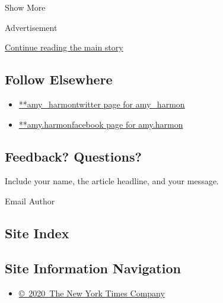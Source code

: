 Show More

Advertisement

\protect\hyperlink{after-mid2}{Continue reading the main story}

\hypertarget{follow-elsewhere}{%
\subsection{Follow Elsewhere}\label{follow-elsewhere}}

\begin{itemize}
\tightlist
\item
  \href{https://twitter.com/amy_harmon}{**amy\_harmontwitter page for
  amy\_harmon}
\item
  \href{https://www.facebook.com/amy.harmon}{**amy.harmonfacebook page
  for amy.harmon}
\end{itemize}

\hypertarget{feedback-questions}{%
\subsection{Feedback? Questions?}\label{feedback-questions}}

Include your name, the article headline, and your message.

Email Author

\hypertarget{site-index}{%
\subsection{Site Index}\label{site-index}}

\hypertarget{site-information-navigation}{%
\subsection{Site Information
Navigation}\label{site-information-navigation}}

\begin{itemize}
\tightlist
\item
  \href{https://help.nytimes.com/hc/en-us/articles/115014792127-Copyright-notice}{©~2020~The
  New York Times Company}
\end{itemize}

